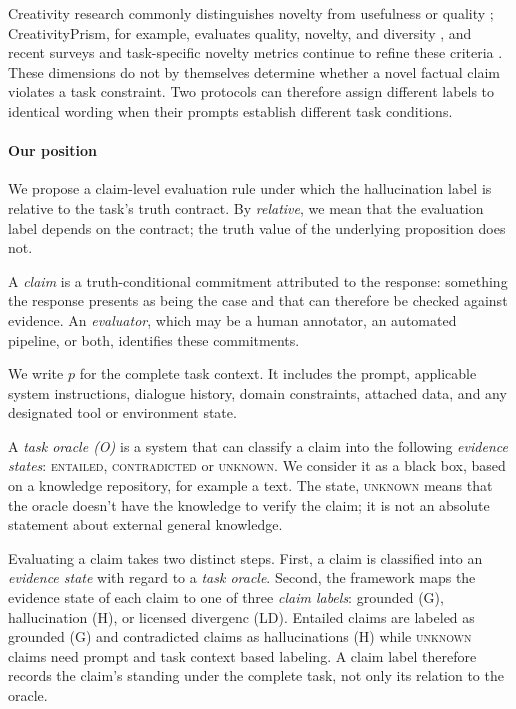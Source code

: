 \documentclass{clv2025}
\begin{document}
Creativity research commonly distinguishes novelty from usefulness or quality
\citep{runco_standard_2012,diedrich_are_2015};
CreativityPrism, for example, evaluates quality, novelty, and diversity
\citep{hou_creativityprism_2025}, and recent surveys and task-specific novelty
metrics continue to refine these criteria
\citep{ismayilzada_progress_2024,zhao_assessing_2025,namuduri_genie_2026}.
These dimensions do not by themselves determine whether a novel factual claim
violates a task constraint.
Two protocols can therefore assign different labels to identical wording when
their prompts establish different task conditions.

\paragraph{Our position}
We propose a claim-level evaluation rule under which the hallucination label is
relative to the task's truth contract. By \emph{relative}, we mean that the
evaluation label depends on the contract; the truth value of the underlying
proposition does not.

A \emph{claim} is a truth-conditional commitment attributed to the response:
something the response presents as being the case and that can therefore be
checked against evidence. An \emph{evaluator}, which may be a human annotator,
an automated pipeline, or both, identifies these commitments.

We write $p$ for the complete task context. It includes the prompt, applicable
system instructions, dialogue history, domain constraints, attached data, and
any designated tool or environment state.

 A \emph{task oracle (O)}  is a system that can classify a claim into the following \emph{evidence states}:  \textsc{entailed},
\textsc{contradicted} or \textsc{unknown}. We consider it as a black box, based on a knowledge repository, for example a text. The state, \textsc{unknown} means that
the oracle doesn't have the knowledge to verify the claim; it is not an absolute
statement about external general knowledge.

Evaluating a claim takes two distinct steps. First, a claim is classified into an \emph{evidence state} with regard to a \emph{task oracle}.   %
Second, the framework maps the evidence state of each claim to one of three \emph{claim
labels}: grounded (G), hallucination (H), or licensed divergenc (LD). Entailed claims are labeled as
grounded (G) and contradicted claims as hallucinations (H) while \textsc{unknown}
claims need prompt and task context based labeling. %
A claim label therefore records the claim's standing under the complete task, not only its relation to the oracle.
\end{document}
